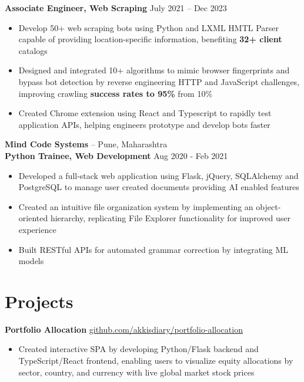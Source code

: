 \documentclass[11pt]{article}       %
\begin{document}
\vspace{-5pt}
\textbf{Associate Engineer, Web Scraping} \hfill July 2021 -- Dec 2023 \\
\vspace{-9pt}
\begin{itemize}
  \item Develop 50+ web scraping bots using Python and LXML HMTL Parser capable of providing location-specific information, benefiting \textbf{32+ client} catalogs \\ 
  \item Designed and integrated 10+ algorithms to mimic browser fingerprints and bypass bot detection by reverse engineering HTTP and JavaScript challenges, improving crawling \textbf{success rates to 95\%} from 10\% \\
  \item Created Chrome extension using React and Typescript to rapidly test application APIs, helping engineers prototype and develop bots faster \\
\end{itemize}

\textbf {Mind Code Systems} -- Pune, Maharashtra \\
\textbf{Python Trainee, Web Development} \hfill Aug 2020 - Feb 2021 \\
\vspace{-9pt}
\begin{itemize}
  \item Developed a full-stack web application using Flask, jQuery, SQLAlchemy and PostgreSQL to manage user created documents providing AI enabled features \\
  \item Created an intuitive file organization system by implementing an object-oriented hierarchy, replicating File Explorer functionality for improved user experience \\
  \item Built RESTful APIs for automated grammar correction by integrating ML models \\
\end{itemize}

\vspace{-18.5pt}

\section*{Projects}
\textbf{Portfolio Allocation} \hfill \href{https://github.com/Akkisdiary/portfolio-allocation}{github.com/akkisdiary/portfolio-allocation} \\
\vspace{-9pt}
\begin{itemize}
  \item Created interactive SPA by developing Python/Flask backend and TypeScript/React frontend, enabling users to visualize equity allocations by sector, country, and currency with live global market stock prices \\
\end{itemize}
\end{document}
